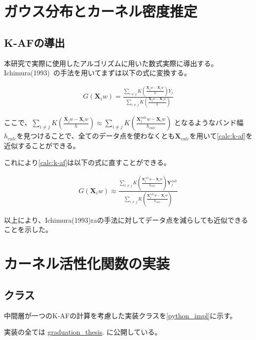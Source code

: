 \appendix
\chapter{ガウス分布とカーネル密度推定}


\section{K-AFの導出}
\label{appendix:calc}

本研究で実際に使用したアルゴリズムに用いた数式実際に導出する。
Ichimura(1993)~\cite{ichimura}の手法を用いてまずは以下の式に変換する。


\begin{eqnarray}
G(\mathbf{X}_iw)=\frac{\sum_{i\neq j} K\left(\frac{\mathbf{X}_j w - \mathbf{X}_i w}{h}\right)Y_j}{\sum_{i\neq j} K\left(\frac{\mathbf{X}_j w - \mathbf{X}_i w}{h}\right)}
\label{calc:k-af}
\end{eqnarray}

ここで、$ \sum_{i\neq j} K\left(\frac{\mathbf{X}_j w - \mathbf{X}_i w}{h}\right) \approx	\sum_{i\neq j} K\left(\frac{\mathbf{X}^{calc}_j w - \mathbf{X}_i w}{h_{calc}}\right)$
となるようなバンド幅$ h_{calc} $を見つけることで、全てのデータ点を使わなくとも$ \mathbf{X}_{calc} $を用いて\ref{calc:k-af}を近似することができる。

これにより\ref{calc:k-af}は以下の式に直すことができる。

\begin{eqnarray}
G(\mathbf{X}_iw) \approx \frac{\sum_{i\neq j} K\left(\frac{\mathbf{X}^{calc}_j w - \mathbf{X}_i w}{h_{calc}}\right)\mathbf{Y}^{calc}_j}{\sum_{i\neq j} K\left(\frac{\mathbf{X}^{calc}_j w - \mathbf{X}_i w}{h_{calc}}\right)}
\label{calc:k-af-2}
\end{eqnarray}

以上により、Ichimura(1993)raの手法に対してデータ点を減らしても近似できることを示した。


\chapter{カーネル活性化関数の実装}
\label{appendix:algorithm}


\section{クラス}


中間層が一つのK-AFの計算を考慮した実装クラスを\ref{python_impl}に示す。

実装の全ては \href{https://github.com/latte0/graduation\_thesis}{graduation\_thesis}. に公開している。

